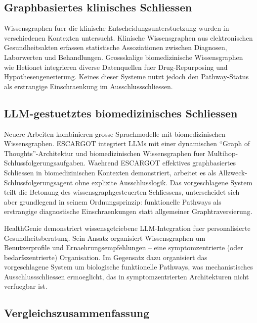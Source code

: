 \documentclass[12pt,a4paper]{article}
\begin{document}
\subsection*{Graphbasiertes klinisches Schliessen}

Wissensgraphen fuer die klinische Entscheidungsunterstuetzung wurden in verschiedenen Kontexten untersucht. Klinische Wissensgraphen aus elektronischen Gesundheitsakten \citep{Rotmensch2017} erfassen statistische Assoziationen zwischen Diagnosen, Laborwerten und Behandlungen. Grossskalige biomedizinische Wissensgraphen wie Hetionet \citep{Himmelstein2017} integrieren diverse Datenquellen fuer Drug-Repurposing und Hypothesengenerierung. Keines dieser Systeme nutzt jedoch den Pathway-Status als erstrangige Einschraenkung im Ausschlussschliessen.

\subsection*{LLM-gestuetztes biomedizinisches Schliessen}

Neuere Arbeiten kombinieren grosse Sprachmodelle mit biomedizinischen Wissensgraphen. ESCARGOT \citep{Matsumoto2025} integriert LLMs mit einer dynamischen "`Graph of Thoughts"'-Architektur und biomedizinischen Wissensgraphen fuer Multihop-Schlussfolgerungsaufgaben. Waehrend ESCARGOT effektives graphbasiertes Schliessen in biomedizinischen Kontexten demonstriert, arbeitet es als Allzweck-Schlussfolgerungsagent ohne explizite Ausschlusslogik. Das vorgeschlagene System teilt die Betonung des wissensgraphgesteuerten Schliessens, unterscheidet sich aber grundlegend in seinem Ordnungsprinzip: funktionelle Pathways als erstrangige diagnostische Einschraenkungen statt allgemeiner Graphtraversierung.

HealthGenie \citep{Gao2025} demonstriert wissensgetriebene LLM-Integration fuer personalisierte Gesundheitsberatung. Sein Ansatz organisiert Wissensgraphen um Benutzerprofile und Ernaehrungsempfehlungen -- eine symptomzentrierte (oder bedarfszentrierte) Organisation. Im Gegensatz dazu organisiert das vorgeschlagene System um biologische funktionelle Pathways, was mechanistisches Ausschlussschliessen ermoeglicht, das in symptomzentrierten Architekturen nicht verfuegbar ist.

\subsection*{Vergleichszusammenfassung}
\end{document}

